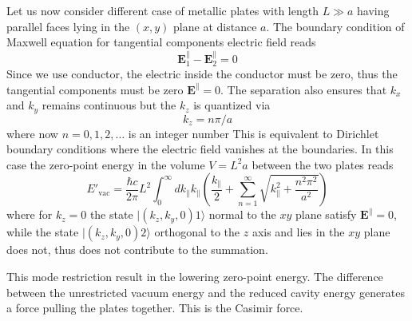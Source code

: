 \documentclass[../../../main.tex]{subfiles}
\begin{document}
Let us now consider different  case of metallic plates with length $L \gg a$ having parallel faces lying in the $(x,y)$ plane at distance $a$.
The boundary condition of Maxwell equation for tangential components electric field reads
\begin{equation*}
  \mathbf{E}_1^{\parallel} - \mathbf{E}_2^{\parallel}=0
\end{equation*}
Since we use conductor, the electric inside the conductor must be zero, thus the tangential components must be zero $\mathbf{E}^{\parallel}=0$.
The separation also ensures that $k_x$ and $k_y$ remains continuous but the $k_{z}$ is quantized via
\begin{equation*}
  k_{z} = n \pi/a
\end{equation*}
where now $n = 0, 1, 2, \ldots$ is an integer number
This is equivalent to  Dirichlet boundary conditions where the electric field vanishes at the boundaries.
In this case the zero-point energy in the volume $V = L^{2} a$ between the two plates reads
\begin{equation*}
  E'_\text{vac} =
  \frac{\hbar c}{2\pi} L^{2} \int_{0}^{\infty} dk_{\parallel}k_{\parallel} \left( \frac{k_{\parallel}}{2} + \sum_{n=1}^{\infty} \sqrt{k_{\parallel} ^{2}+ \frac{n^{2} \pi^{2}}{a^{2}}}  \right)
\end{equation*}
where for \( k_z = 0 \) the state \(|(k_z, k_y, 0)1\rangle\)  normal to the \( xy \) plane satisfy $\mathbf{E}^{\parallel}=0$, while the state \(|(k_z, k_y, 0)2\rangle\) orthogonal to the \( z \) axis and lies in the $xy$ plane does not, thus does not contribute to the summation.

This mode restriction result in the lowering zero-point energy.
The difference between the unrestricted vacuum energy and the reduced cavity energy generates a force pulling the plates together.
This is the Casimir force.
\end{document}
